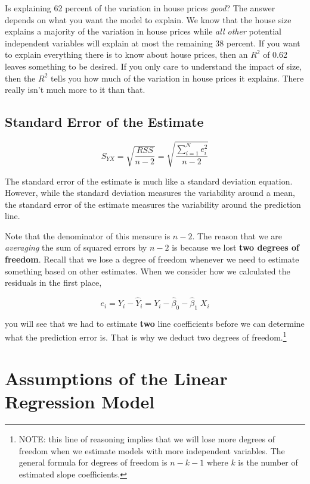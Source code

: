 \documentclass[
]{book}
\begin{document}
Is explaining 62 percent of the variation in house prices \emph{good}? The answer depends on what you want the model to explain. We know that the house size explains a majority of the variation in house prices while \emph{all other} potential independent variables will explain at most the remaining 38 percent. If you want to explain everything there is to know about house prices, then an \(R^2\) of 0.62 leaves something to be desired. If you only care to understand the impact of size, then the \(R^2\) tells you how much of the variation in house prices it explains. There really isn't much more to it than that.

\hypertarget{standard-error-of-the-estimate}{%
\subsection{Standard Error of the Estimate}\label{standard-error-of-the-estimate}}

\[S_{YX} = \sqrt{\frac{RSS}{n-2}} = \sqrt{\frac{\sum^{N}_{i=1}e_i^2}{n-2}}\]

The standard error of the estimate is much like a standard deviation equation. However, while the standard deviation measures the variability around a mean, the standard error of the estimate measures the variability around the prediction line.

Note that the denominator of this measure is \(n-2\). The reason that we are \emph{averaging} the sum of squared errors by \(n-2\) is because we lost \textbf{two degrees of freedom}. Recall that we lose a degree of freedom whenever we need to estimate something based on other estimates. When we consider how we calculated the residuals in the first place,

\[ e_i = Y_i - \hat{Y}_i = Y_i - \hat{\beta}_0 - \hat{\beta}_1 \; X_i\]

you will see that we had to estimate \textbf{two} line coefficients before we can determine what the prediction error is. That is why we deduct two degrees of freedom.\footnote{NOTE: this line of reasoning implies that we will lose more degrees of freedom when we estimate models with more independent variables. The general formula for degrees of freedom is \(n-k-1\) where \(k\) is the number of estimated slope coefficients.}

\hypertarget{assumptions-of-the-linear-regression-model}{%
\section{Assumptions of the Linear Regression Model}\label{assumptions-of-the-linear-regression-model}}
\end{document}
